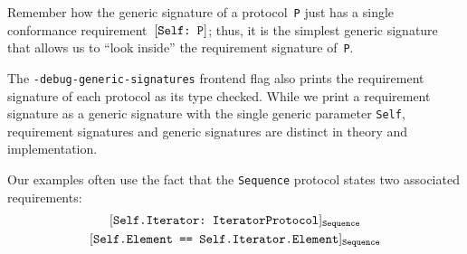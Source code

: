 \documentclass[../generics]{subfiles}
\begin{document}
Remember how the generic signature of a protocol~\texttt{P} just has a single conformance requirement~$[\texttt{Self:~P}]$; thus, it is the simplest generic signature that allows us to ``look inside'' the requirement signature of~\texttt{P}.

The \texttt{-debug-generic-signatures} frontend flag also prints the requirement signature of each protocol as its type checked. While we print a requirement signature as a generic signature with the single generic parameter \texttt{Self}, requirement signatures and generic signatures are distinct in theory and implementation.

Our examples often use the fact that the \texttt{Sequence} protocol states two associated requirements:
\begin{gather*}
\ConfReq{Self.Iterator}{IteratorProtocol}_\texttt{Sequence}\\
\SameReq{Self.Element}{Self.Iterator.Element}_\texttt{Sequence}
\end{gather*}
\end{document}
